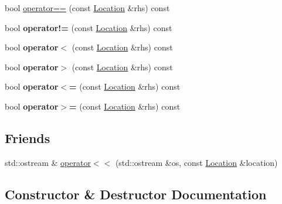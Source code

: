 \begin{DoxyCompactItemize}
bool \hyperlink{classroadfighter_1_1Location_a41950b871d6b83269c063e9d34bbc24c}{operator==} (const \hyperlink{classroadfighter_1_1Location}{Location} \&rhs) const
\item 
\mbox{\label{classroadfighter_1_1Location_a877f37551c7d4bfda9a5c10402a3b878}} 
bool {\bfseries operator!=} (const \hyperlink{classroadfighter_1_1Location}{Location} \&rhs) const
\item 
\mbox{\label{classroadfighter_1_1Location_a2c2d74f423031ac1ca6c7652c5e52016}} 
bool {\bfseries operator$<$} (const \hyperlink{classroadfighter_1_1Location}{Location} \&rhs) const
\item 
\mbox{\label{classroadfighter_1_1Location_a64fb72368cace631d2908dca9d75029e}} 
bool {\bfseries operator$>$} (const \hyperlink{classroadfighter_1_1Location}{Location} \&rhs) const
\item 
\mbox{\label{classroadfighter_1_1Location_ac0c597b886d5f83d34e8937338d46564}} 
bool {\bfseries operator$<$=} (const \hyperlink{classroadfighter_1_1Location}{Location} \&rhs) const
\item 
\mbox{\label{classroadfighter_1_1Location_ab0be37114084b90dd99dbec1f1745a38}} 
bool {\bfseries operator$>$=} (const \hyperlink{classroadfighter_1_1Location}{Location} \&rhs) const
\end{DoxyCompactItemize}
\subsection*{Friends}
\begin{DoxyCompactItemize}
\item 
std\+::ostream \& \hyperlink{classroadfighter_1_1Location_aec4517a843218b97cd7d4d6fccc07449}{operator$<$$<$} (std\+::ostream \&os, const \hyperlink{classroadfighter_1_1Location}{Location} \&location)
\end{DoxyCompactItemize}


\subsection{Constructor \& Destructor Documentation}
\mbox{\label{classroadfighter_1_1Location_a395576ed62896c91fde69ec96067b76d}} 
